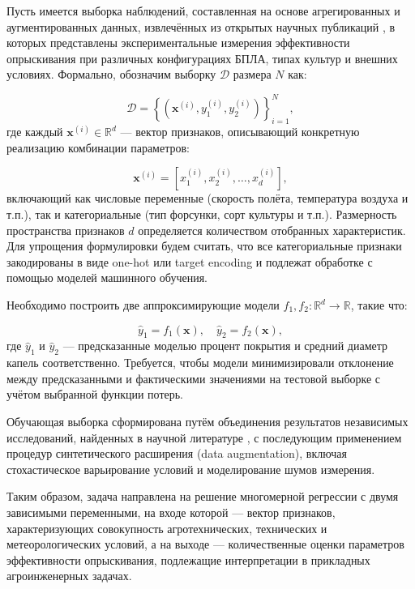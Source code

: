 Пусть имеется выборка наблюдений, составленная на основе агрегированных и аугментированных данных, извлечённых из открытых научных публикаций \cite{Liu2025, Wu2025}, в которых представлены экспериментальные измерения эффективности опрыскивания при различных конфигурациях БПЛА, типах культур и внешних условиях. Формально, обозначим выборку $\mathcal{D}$ размера $N$ как:

\begin{equation}
	\mathcal{D} = \left\{ \left(\mathbf{x}^{(i)}, y_1^{(i)}, y_2^{(i)}\right) \right\}_{i=1}^{N},
\end{equation}
где каждый $\mathbf{x}^{(i)} \in \mathbb{R}^d$ --- вектор признаков, описывающий конкретную реализацию комбинации параметров:

\begin{equation}
\mathbf{x}^{(i)} = \left[ x_1^{(i)}, x_2^{(i)}, \ldots, x_d^{(i)} \right],
\end{equation}
включающий как числовые переменные (скорость полёта, температура воздуха и т.п.), так и категориальные (тип форсунки, сорт культуры и т.п.). Размерность пространства признаков $d$ определяется количеством отобранных характеристик. Для упрощения формулировки будем считать, что все категориальные признаки закодированы в виде one-hot или target encoding и подлежат обработке с помощью моделей машинного обучения.

Необходимо построить две аппроксимирующие модели $f_1, f_2: \mathbb{R}^d \to \mathbb{R}$, такие что:

\begin{equation}
	\hat{y}_1 = f_1(\mathbf{x}), \quad \hat{y}_2 = f_2(\mathbf{x}),
\end{equation}
где $\hat{y}_1$ и $\hat{y}_2$ --- предсказанные моделью процент покрытия и средний диаметр капель соответственно. Требуется, чтобы модели минимизировали отклонение между предсказанными и фактическими значениями на тестовой выборке с учётом выбранной функции потерь. 

Обучающая выборка сформирована путём объединения результатов независимых  исследований, найденных в научной литературе \cite{Liu2025, Wu2025, Vitoria2022}, с последующим применением процедур синтетического расширения (data augmentation), включая стохастическое варьирование условий и моделирование шумов измерения.

Таким образом, задача направлена на решение многомерной регрессии с двумя зависимыми переменными, на входе которой --- вектор признаков, характеризующих совокупность агротехнических, технических и метеорологических условий, а на выходе --- количественные оценки параметров эффективности опрыскивания, подлежащие интерпретации в прикладных агроинженерных задачах.


